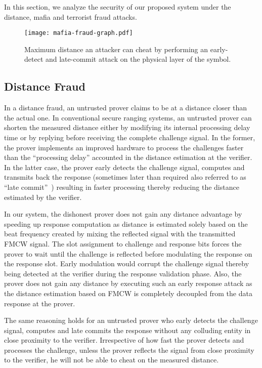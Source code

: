 \documentclass{sig-alternate-10pt}
\begin{document}
In this section, we analyze the security of our proposed system under the
distance, mafia and terrorist fraud attacks.

\begin{figure}[t]
  \centering
  \texttt{[image: mafia-fraud-graph.pdf]}
  \caption{Maximum distance an attacker can cheat by performing an
    early-detect and late-commit attack on the physical layer of the symbol.}
  \label{fig:mafia_fraud_plot}
\end{figure}


\subsection{Distance Fraud}
\label{subsec:distance-fraud}
In a distance fraud, an untrusted prover claims to be at a distance closer than
the actual one. In conventional secure ranging systems, an untrusted prover can
shorten the measured distance either by modifying its internal processing delay
time or by replying before receiving the complete challenge signal. In the
former, the prover implements an improved hardware to process the challenges
faster than the ``processing delay'' accounted in the distance estimation at the
verifier. In the latter case, the prover early detects the challenge signal,
computes and transmits back the response (sometimes later than required also
referred to as ``late commit''~\cite{ClulowSep06}) resulting in faster
processing thereby reducing the distance estimated by the verifier.

In our system, the dishonest prover does not
gain any distance advantage by speeding up response computation as distance is
estimated solely based on the beat frequency created by mixing the reflected
signal with the transmitted FMCW signal. The slot assignment to challenge and
response bits forces the prover to wait until the challenge is reflected before
modulating the response on the response slot. Early modulation would corrupt the
challenge signal thereby being detected at the verifier during the response
validation phase. Also, the prover does not gain any distance by executing such
an early response attack as the distance estimation based on FMCW is completely
decoupled from the data response at the prover.

The same reasoning holds for an untrusted prover who early detects the challenge
signal, computes and late commits the response without any colluding entity in
close proximity to the verifier. Irrespective of how fast the prover detects and
processes the challenge, unless the prover reflects the signal from close
proximity to the verifier, he will not be able to cheat on the measured
distance.
\end{document}
